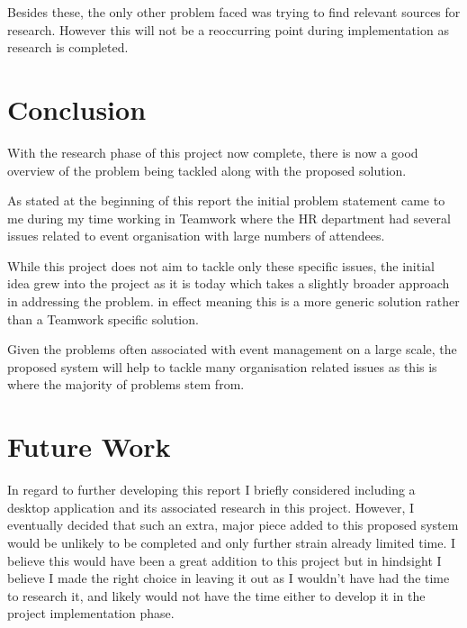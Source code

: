 Besides these, the only other problem faced was trying to find relevant sources for research. However this will not be a reoccurring point during implementation as research is completed.

\section{Conclusion}
\label{section:conclusion}

With the research phase of this project now complete, there is now a good overview of the problem being tackled along with the proposed solution.

As stated at the beginning of this report the initial problem statement came to me during my time working in Teamwork where the HR department had several issues related to event organisation with large numbers of attendees.

While this project does not aim to tackle only these specific issues, the initial idea grew into the project as it is today which takes a slightly broader approach in addressing the problem. in effect meaning this is a more generic solution rather than a Teamwork specific solution.

Given the problems often associated with event management on a large scale, the proposed system will help to tackle many organisation related issues as this is where the majority of problems stem from.

\section{Future Work}
\label{section:futurework}

In regard to further developing this report I briefly considered including a desktop application and its associated research in this project. However, I eventually decided that such an extra, major piece added to this proposed system would be unlikely to be completed and only further strain already limited time. I believe this would have been a great addition to this project but in hindsight I believe I made the right choice in leaving it out as I wouldn't have had the time to research it, and likely would not have the time either to develop it in the project implementation phase. 

